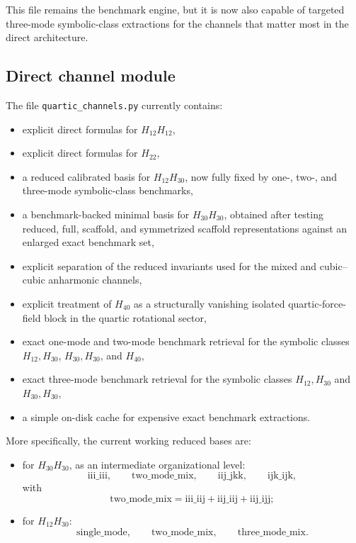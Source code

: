 \documentclass[11pt,a4paper]{article}
\begin{document}
This file remains the benchmark engine, but it is now also capable of targeted three-mode symbolic-class extractions for the channels that matter most in the direct architecture.

\subsection{Direct channel module}
The file
\texttt{quartic\_channels.py}
currently contains:
\begin{itemize}[leftmargin=*]
\item explicit direct formulas for \(H_{12}H_{12}\),
\item explicit direct formulas for \(H_{22}\),
\item a reduced calibrated basis for \(H_{12}H_{30}\), now fully fixed by one-, two-, and three-mode symbolic-class benchmarks,
\item a benchmark-backed minimal basis for \(H_{30}H_{30}\), obtained after testing reduced, full, scaffold, and symmetrized scaffold representations against an enlarged exact benchmark set,
\item explicit separation of the reduced invariants used for the mixed and cubic--cubic anharmonic channels,
\item explicit treatment of \(H_{40}\) as a structurally vanishing isolated quartic-force-field block in the quartic rotational sector,
\item exact one-mode and two-mode benchmark retrieval for the symbolic classes \(H_{12},H_{30}\), \(H_{30},H_{30}\), and \(H_{40}\),
\item exact three-mode benchmark retrieval for the symbolic classes \(H_{12},H_{30}\) and \(H_{30},H_{30}\),
\item a simple on-disk cache for expensive exact benchmark extractions.
\end{itemize}

More specifically, the current working reduced bases are:
\begin{itemize}[leftmargin=*]
\item for \(H_{30}H_{30}\), as an intermediate organizational level:
\[
\mathrm{iii\_iii},\qquad \mathrm{two\_mode\_mix},\qquad \mathrm{iij\_jkk},\qquad \mathrm{ijk\_ijk},
\]
with
\[
\mathrm{two\_mode\_mix}=\mathrm{iii\_iij}+\mathrm{iij\_iij}+\mathrm{iij\_ijj};
\]
\item for \(H_{12}H_{30}\):
\[
\mathrm{single\_mode},\qquad \mathrm{two\_mode\_mix},\qquad \mathrm{three\_mode\_mix}.
\]
\end{itemize}
\end{document}
